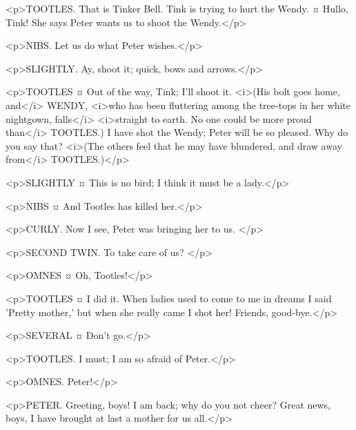 <p>TOOTLES. That is Tinker Bell. Tink is trying to hurt the Wendy.
¤
Hullo, Tink!
She says Peter wants us to shoot the Wendy.</p>

<p>NIBS. Let us do what Peter wishes.</p>

<p>SLIGHTLY. Ay, shoot it; quick, bows and arrows.</p>

<p>TOOTLES ¤
Out of the way, Tink; I'll shoot it. <i>(His bolt goes home, and</i> WENDY, <i>who has been fluttering among the tree-tops in her white nightgown, falls</i> <i>straight to earth. No one could be more proud than</i> TOOTLES.) I have shot the Wendy; Peter will be so pleased.
Why do you say that? <i>(The others feel that he may have blundered, and draw away from</i> TOOTLES.)</p>

<p>SLIGHTLY ¤
This is no bird; I think it must be a lady.</p>

<p>NIBS ¤
And Tootles has killed her.</p>

<p>CURLY. Now I see, Peter was bringing her to us.
</p>

<p>SECOND TWIN. To take care of us?
</p>

<p>OMNES ¤
Oh, Tootles!</p>

<p>TOOTLES ¤
I did it. When ladies used to come to me in dreams I said 'Pretty mother,' but when she really came I shot her!
Friends, good-bye.</p>

<p>SEVERAL ¤
Don't go.</p>

<p>TOOTLES. I must; I am so afraid of Peter.</p>


<p>OMNES. Peter!</p>


<p>PETER. Greeting, boys!
I am back; why do you not cheer? Great news, boys, I have brought at last a mother for us all.</p>

